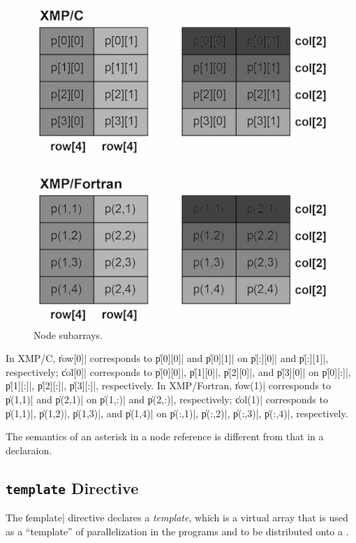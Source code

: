 \begin{figure}
  \centering
  \includegraphics[width=12cm]{figs/row_col.png}
  \caption{Node subarrays.}
  \label{fig:partial}
\end{figure}

In XMP/C, \|row[0]| corresponds to \|p[0][0]| and \|p[0][1]| on
\|p[:][0]| and \|p[:][1]|, respectively; 
%
\|col[0]| corresponds to \|p[0][0]|, \|p[1][0]|, \|p[2][0]|, and \|p[3][0]|
on \|p[0][:]|, \|p[1][:]|, \|p[2][:]|, \|p[3][:]|, respectively.
%
In XMP/Fortran, \|row(1)| corresponds to \|p(1,1)| and \|p(2,1)| on
\|p(1,:)| and \|p(2,:)|, respectively;
%
\|col(1)| corresponds to \|p(1,1)|, \|p(1,2)|, \|p(1,3)|, and \|p(1,4)|
on \|p(:,1)|, \|p(:,2)|, \|p(:,3)|, \|p(:,4)|, respectively.

\begin{mynote}
  The semantics of an asterisk in a node reference is different from
  that in a declaraion.
\end{mynote}


\subsection{{\tt template} Directive}

The \|template| directive declares a {\it template}, which is a virtual
array that is used as a ``template'' of parallelization in the programs
and to be distributed onto a {\narray}.

